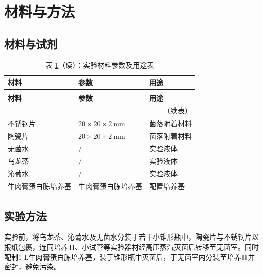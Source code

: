 \documentclass[12pt,a4paper]{ctexart}
\begin{document}
\section{材料与方法}
\subsection{材料与试剂}
\begin{longtable}{lll}  %
  \caption{实验材料参数及用途表} \label{tab:material} \\  %
  \toprule  %
  \textbf{材料} & \textbf{参数} & \textbf{用途} \\  %
  \midrule  %
  \endfirsthead  %

  \caption*{表 \ref{tab:material}（续）：实验材料参数及用途表} \\  %
  \toprule
  \textbf{材料} & \textbf{参数} & \textbf{用途} \\
  \midrule
  \endhead  %

  \bottomrule  %
  \multicolumn{3}{r}{（续表）} \\  %
  \endfoot  %

  \bottomrule  %
  \endlastfoot  %

  不锈钢片             & $20 \times 20 \times 2\ \mathrm{mm}$ & 菌落附着材料 \\
  陶瓷片               & $20 \times 20 \times 2\ \mathrm{mm}$ & 菌落附着材料 \\
  无菌水               & /                                   & 实验液体     \\
  乌龙茶               & /                                   & 实验液体     \\
  沁葡水               & /                                   & 实验液体     \\
  牛肉膏蛋白胨培养基   & 牛肉膏蛋白胨培养基                   & 配置培养基   \\
\end{longtable}

\subsection{实验方法}
实验前，将乌龙茶、沁葡水及无菌水分装于若干小锥形瓶中，陶瓷片与不锈钢片以报纸包裹，连同培养皿、小试管等实验器材经高压蒸汽灭菌后转移至无菌室。同时配制1 L牛肉膏蛋白胨培养基，装于锥形瓶中灭菌后，于无菌室内分装至培养皿并密封，避免污染。
\end{document}
